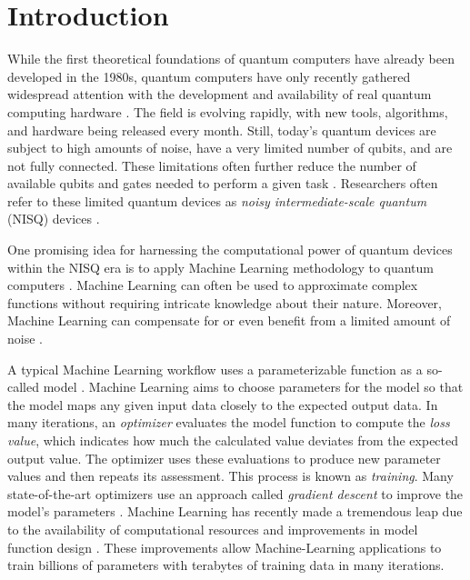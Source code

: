 \chapter{Introduction}
\label{chap:intro}

While the first theoretical foundations of quantum computers have already been
developed in the 1980s, quantum computers have only recently gathered widespread
attention with the development and availability of real quantum computing
hardware \cite{nielsen_quantum_2007,hidary_quantum_2021}.
The field is evolving rapidly, with new tools, algorithms, and hardware being
released every month.
Still, today's quantum devices are subject to high amounts of noise, have a very
limited number of qubits, and are not fully connected.
These limitations often further reduce the number of available qubits and gates
needed to perform a given task \cite{cerezo_variational_2021}.
Researchers often refer to these limited quantum devices as
\emph{noisy intermediate-scale quantum} (NISQ) devices
\cite{preskill_quantum_2018}.

One promising idea for harnessing the computational power of quantum devices
within the NISQ era is to apply Machine Learning methodology to quantum
computers \cite{cerezo_variational_2021}.
Machine Learning can often be used to approximate complex functions without
requiring intricate knowledge about their nature.
Moreover, Machine Learning can compensate for or even benefit from a limited
amount of noise \cite{ciliberto_quantum_2018}.

A typical Machine Learning workflow uses a parameterizable function as a
so-called model \cite{bishop_pattern_2006}.
Machine Learning aims to choose parameters for the model so that the model maps
any given input data closely to the expected output data.
In many iterations, an \emph{optimizer} evaluates the model function to compute
the \emph{loss value}, which indicates how much the calculated value deviates
from the expected output value.
The optimizer uses these evaluations to produce new parameter values and then
repeats its assessment.
This process is known as \emph{training}.
Many state-of-the-art optimizers use an approach called \emph{gradient descent}
to improve the model's parameters \cite{benedetti_parameterized_2019}.
Machine Learning has recently made a tremendous leap due to the availability of
computational resources and improvements in model function design
\cite{jordan_machine_2015}.
These improvements allow Machine-Learning applications to train billions of
parameters with terabytes of training data in many iterations.

